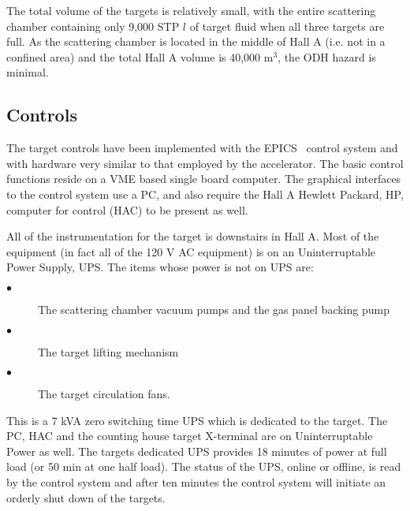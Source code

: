 {\begin{safetyen}{10}{5}
The total volume of the targets is relatively small, with the entire
scattering chamber containing only 9,000 STP $l$ of target
fluid when all three targets are full. As the scattering chamber
is located in the middle of Hall A
(i.e. not in a confined area) and the total Hall A volume is 40,000 m$^3$,
the ODH hazard is minimal.
\end{safetyen}

\subsection{ Controls}

The target controls have been implemented with the EPICS~\cite{EPICSwww} control
system and with hardware very similar to that employed by the accelerator.
The basic control functions reside on a VME based single board
computer. The graphical interfaces to the control system use a PC, and
also require the Hall A Hewlett Packard, HP, computer for control (HAC)
to be present as well.

All of the instrumentation for the target is downstairs in Hall A.
Most of the equipment (in fact all of the 120 V AC equipment) is
on an Uninterruptable Power Supply, UPS. The items whose power
is not on UPS are:
\begin{description}
\item[$\bullet$] The scattering chamber vacuum pumps and the gas panel
backing pump
\item[$\bullet$] The target lifting mechanism
\item[$\bullet$] The target circulation fans.
\end{description}
This is a 7 kVA zero switching time
UPS which is dedicated to the target. The PC, HAC and the counting house target
X-terminal are on Uninterruptable Power as well. 
The targets dedicated UPS provides 18 minutes of power at full load
(or 50 min at one half load). The status of the UPS, online or offline,
is read by the control system and after ten minutes the control system
will initiate an orderly shut down of the targets.

}
